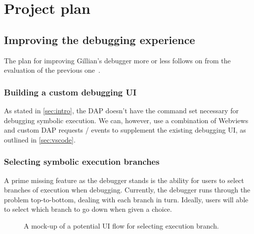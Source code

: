 
\chapter{Project plan}
\label{cha:plan}

\section{Improving the debugging experience}

The plan for improving Gillian's debugger more or less follows on from the evaluation of the previous one~\cite{gillian-debugging-2021}.

\subsection{Building a custom debugging UI}

As stated in \autoref{sec:intro}, the DAP doesn't have the command
set necessary for debugging symbolic execution. We can, however, use a
combination of Webviews and custom DAP requests / events to supplement the
existing debugging UI, as outlined in \autoref{sec:vscode}.

\subsection{Selecting symbolic execution branches}

A prime missing feature as the debugger stands is the ability for users to
select branches of execution when debugging. Currently, the debugger runs
through the problem top-to-bottom, dealing with each branch in turn. Ideally,
users will able to select which branch to go down when given a choice.

\begin{figure}
  \noindent
  \caption{A mock-up of a potential UI flow for selecting execution branch.}
  \label{fig:branch-selection-mockup}
\end{figure}

